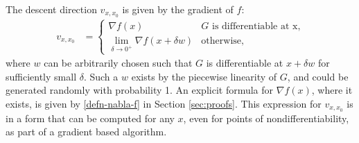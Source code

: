 \documentclass[11pt]{article}
\newcommand{\red}[1]{{\color{black} #1}}
\newcommand{\xo}{x_0}
\newcommand{\vxxo}{v_{x, \xo}}
\begin{document}
\red{The descent direction $\vxxo$ is given by the gradient of $f$:
\begin{align*}
\vxxo &= \begin{cases}\nabla f(x) & G \text{ is differentiable at x,}\\ \lim_{\delta \to 0^+} \nabla f(x + \delta w) & \text{otherwise,} \end{cases} 
\end{align*}
where $w$ can be arbitrarily chosen such that $G$ is differentiable at $x+\delta w$ for sufficiently small $\delta$.  Such a $w$ exists by the piecewise linearity of $G$, and could be generated randomly with probability 1.   An explicit formula for $\nabla f(x)$, where it exists, is given by \eqref{defn-nabla-f} in Section \ref{sec:proofs}.  This expression for $\vxxo$ is in a form that can be computed for any $x$, even for points of nondifferentiability, as part of a gradient based algorithm.  }
\end{document}
